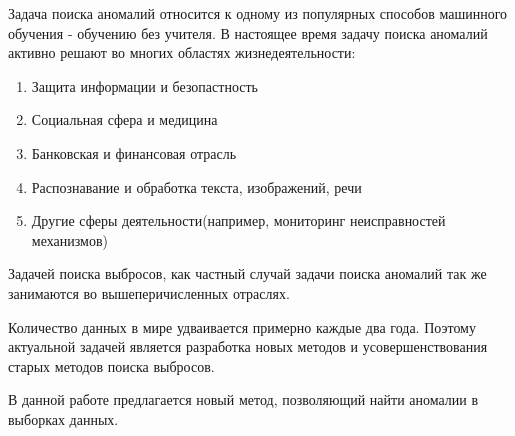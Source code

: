 \Introduction

Задача поиска аномалий относится к одному из популярных способов машинного обучения - обучению без учителя. В настоящее время задачу поиска аномалий активно решают во многих областях жизнедеятельности:
\begin{enumerate} 
	\item Защита информации и безопастность
	\item Социальная сфера и медицина
	\item Банковская и финансовая отрасль
	\item Распознавание и обработка текста, изображений, речи
	\item Другие сферы деятельности(например, мониторинг неисправностей механизмов)
\end{enumerate}
Задачей поиска выбросов, как частный случай задачи поиска аномалий так же занимаются во вышеперичисленных отраслях. 

Количество данных в мире удваивается примерно каждые два года. Поэтому актуальной задачей является разработка новых методов и усовершенствования старых методов поиска выбросов.

В данной работе предлагается новый метод, позволяющий найти аномалии в выборках данных.




